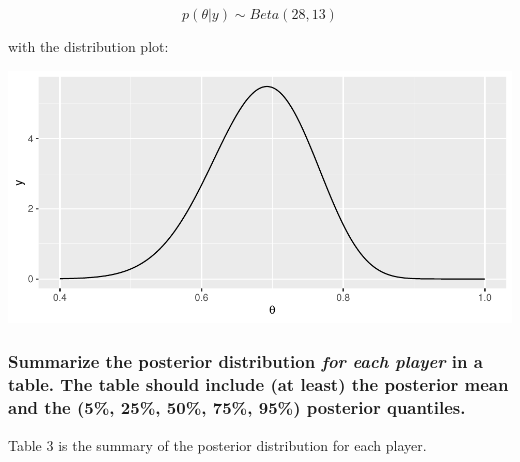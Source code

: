 \documentclass[
]{article}
\begin{document}
\[p(\theta|y) \sim Beta(28, 13) \]

with the distribution plot:

\includegraphics{homework_1_files/figure-latex/unnamed-chunk-4-1.pdf}

\hypertarget{summarize-the-posterior-distribution-for-each-player-in-a-table.-the-table-should-include-at-least-the-posterior-mean-and-the-5-25-50-75-95-posterior-quantiles.}{%
\subsubsection{\texorpdfstring{Summarize the posterior distribution
\emph{for each player} in a table. The table should include (at least)
the posterior mean and the (5\%, 25\%, 50\%, 75\%, 95\%) posterior
quantiles.}{Summarize the posterior distribution for each player in a table. The table should include (at least) the posterior mean and the (5\%, 25\%, 50\%, 75\%, 95\%) posterior quantiles.}}\label{summarize-the-posterior-distribution-for-each-player-in-a-table.-the-table-should-include-at-least-the-posterior-mean-and-the-5-25-50-75-95-posterior-quantiles.}}

Table 3 is the summary of the posterior distribution for each player.
\end{document}
